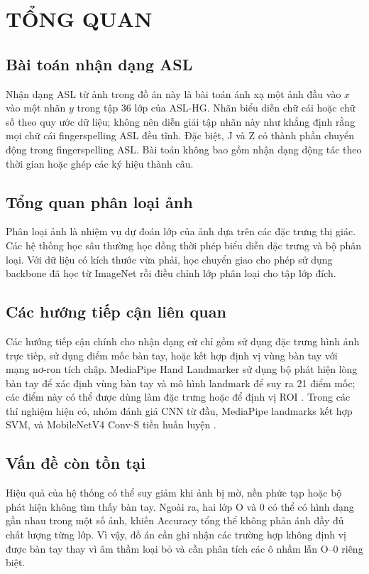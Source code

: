 \chapter{TỔNG QUAN}

\section{Bài toán nhận dạng ASL}
Nhận dạng ASL từ ảnh trong đồ án này là bài toán ánh xạ một ảnh đầu vào $x$ vào một nhãn $y$ trong tập 36 lớp của ASL-HG. Nhãn biểu diễn chữ cái hoặc chữ số theo quy ước dữ liệu; không nên diễn giải tập nhãn này như khẳng định rằng mọi chữ cái fingerspelling ASL đều tĩnh. Đặc biệt, J và Z có thành phần chuyển động trong fingerspelling ASL. Bài toán không bao gồm nhận dạng động tác theo thời gian hoặc ghép các ký hiệu thành câu.

\section{Tổng quan phân loại ảnh}
Phân loại ảnh là nhiệm vụ dự đoán lớp của ảnh dựa trên các đặc trưng thị giác. Các hệ thống học sâu thường học đồng thời phép biểu diễn đặc trưng và bộ phân loại. Với dữ liệu có kích thước vừa phải, học chuyển giao cho phép sử dụng backbone đã học từ ImageNet rồi điều chỉnh lớp phân loại cho tập lớp đích.

\section{Các hướng tiếp cận liên quan}
Các hướng tiếp cận chính cho nhận dạng cử chỉ gồm sử dụng đặc trưng hình ảnh trực tiếp, sử dụng điểm mốc bàn tay, hoặc kết hợp định vị vùng bàn tay với mạng nơ-ron tích chập. MediaPipe Hand Landmarker sử dụng bộ phát hiện lòng bàn tay để xác định vùng bàn tay và mô hình landmark để suy ra 21 điểm mốc; các điểm này có thể được dùng làm đặc trưng hoặc để định vị ROI \cite{mediapipe}. Trong các thí nghiệm hiện có, nhóm đánh giá CNN từ đầu, MediaPipe landmarks kết hợp SVM, và MobileNetV4 Conv-S tiền huấn luyện \cite{mobilenetv4}.

\section{Vấn đề còn tồn tại}
Hiệu quả của hệ thống có thể suy giảm khi ảnh bị mờ, nền phức tạp hoặc bộ phát hiện không tìm thấy bàn tay. Ngoài ra, hai lớp O và 0 có thể có hình dạng gần nhau trong một số ảnh, khiến Accuracy tổng thể không phản ánh đầy đủ chất lượng từng lớp. Vì vậy, đồ án cần ghi nhận các trường hợp không định vị được bàn tay thay vì âm thầm loại bỏ và cần phân tích các ô nhầm lẫn O--0 riêng biệt.

